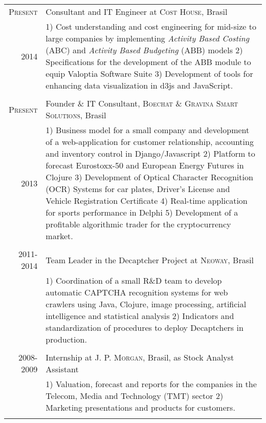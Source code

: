 \documentclass[a4paper,10pt]{article} %
\begin{document}
\begin{tabular}{r|p{11.5cm}}
  \textsc{Present} &
  Consultant and IT Engineer at \textsc{Cost House}, Brasil \\
  \textsc{2014} &
  \footnotesize{
  1) Cost understanding and cost
  engineering for mid-size to large companies by implementing \textit{Activity Based
  Costing} (ABC) and \textit{Activity Based Budgeting} (ABB) models
  2) Specifications for the development of the ABB module to equip Valoptia Software
  Suite
  3) Development of tools for enhancing data visualization in d3js and JavaScript. }\\
\multicolumn{2}{c}{} \\


\textsc{Present} &
Founder \& IT Consultant, \textsc{Boechat \&  Gravina Smart Solutions}, Brasil \\
\textsc{2013} &
\footnotesize{
  1) Business model for a small company and
  development of a web-application for
  customer relationship, accounting and inventory control in
  Django/Javascript
  2) Platform to forecast Eurostoxx-50 and European Energy Futures in
  Clojure
  3) Development of Optical Character Recognition (OCR) Systems for
  car plates, Driver's License and Vehicle Registration Certificate
  4) Real-time application for sports performance in Delphi
  5) Development of a profitable algorithmic trader for the
  cryptocurrency market. 
  }
\\
\multicolumn{2}{c}{} \\


\textsc{2011-2014} &
Team Leader in the Decaptcher Project at
\textsc{Neoway}, Brasil \\
& \footnotesize{
  1) Coordination of a small R\&D team to develop automatic
  CAPTCHA recognition systems for web crawlers using Java, Clojure,
  image processing, artificial intelligence and statistical analysis
  2) Indicators and standardization of procedures to deploy Decaptchers in production.} \\
\multicolumn{2}{c}{} \\


\textsc{2008-2009} &
Internship at \textsc{J. P. Morgan}, Brasil, as Stock Analyst Assistant \\
& \footnotesize{
  1) Valuation, forecast and reports for the companies in the Telecom,
  Media and Technology (TMT) sector
  2) Marketing presentations and products for customers.}\\
\multicolumn{2}{c}{} \\


\end{tabular}
\end{document}
